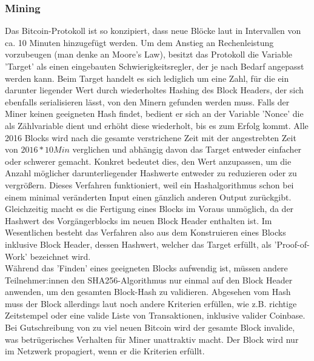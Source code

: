 \subsubsection{Mining}
Das Bitcoin-Protokoll ist so konzipiert, dass neue Blöcke laut \cite{goorha_2019} in Intervallen von ca. 10 Minuten hinzugefügt werden. 
Um dem Anstieg an Rechenleistung vorzubeugen (man denke an Moore's Law), besitzt das Protokoll die Variable 'Target' als einen eingebauten Schwierigkeitsregler, der je nach Bedarf angepasst werden kann.
Beim Target handelt es sich lediglich um eine Zahl, für die ein darunter liegender Wert durch wiederholtes Hashing des Block Headers, der sich ebenfalls serialisieren lässt, von den Minern gefunden werden muss. 
Falls der Miner keinen geeigneten Hash findet, bedient er sich an der Variable 'Nonce' die als Zählvariable dient und erhöht diese wiederholt, bis es zum Erfolg kommt.
Alle 2016 Blocks wird nach \cite{goorha_2019} die gesamte verstrichene Zeit mit der angestrebten Zeit von $2016 * 10 Min$ verglichen und abhängig davon das Target entweder einfacher oder schwerer gemacht. 
Konkret bedeutet dies, den Wert anzupassen, um die Anzahl möglicher darunterliegender Hashwerte entweder zu reduzieren oder zu vergrößern.
Dieses Verfahren funktioniert, weil ein Hashalgorithmus schon bei einem minimal veränderten Input einen gänzlich anderen Output zurückgibt. 
Gleichzeitig macht es die Fertigung eines Blocks im Voraus unmöglich, da der Hashwert des Vorgängerblocks im neuen Block Header enthalten ist. 
Im Wesentlichen besteht das Verfahren also aus dem Konstruieren eines Blocks inklusive Block Header, dessen Hashwert, welcher das Target erfüllt, als 'Proof-of-Work' bezeichnet wird.\\

Während das 'Finden' eines geeigneten Blocks aufwendig ist, müssen andere Teilnehmer:innen den SHA256-Algorithmus nur einmal auf den Block Header anwenden, um den gesamten Block-Hash zu validieren. 
Abgesehen vom Hash muss der Block allerdings laut \cite{antanopoulos_2014} noch andere Kriterien erfüllen, wie z.B. richtige Zeitstempel oder eine valide Liste von Transaktionen, inklusive valider Coinbase. 
Bei Gutschreibung von zu viel neuen Bitcoin wird der gesamte Block invalide, was betrügerisches Verhalten für Miner unattraktiv macht. Der Block wird nur im Netzwerk propagiert, wenn er die Kriterien erfüllt.\\

